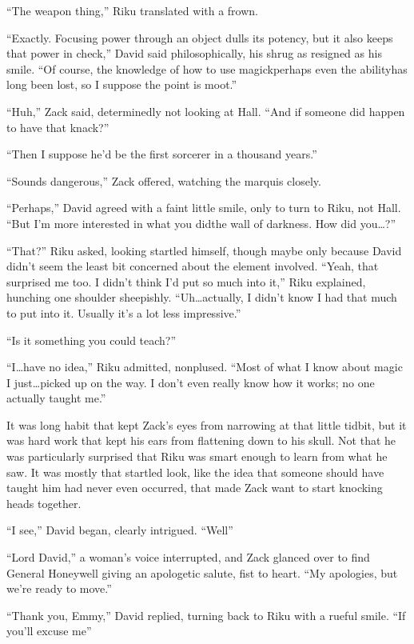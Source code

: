 ``The weapon thing,'' Riku translated with a frown.

``Exactly. Focusing power through an object dulls its potency, but it also keeps that power in check,'' David said philosophically, his shrug as resigned as his smile. ``Of course, the knowledge of how to use magick\textemdash perhaps even the ability\textemdash has long been lost, so I suppose the point is moot.''

``Huh,'' Zack said, determinedly not looking at Hall. ``And if someone did happen to have that knack?''

``Then I suppose he'd be the first sorcerer in a thousand years.''

``Sounds dangerous,'' Zack offered, watching the marquis closely.

``Perhaps,'' David agreed with a faint little smile, only to turn to Riku, not Hall. ``But I'm more interested in what you did\textemdash the wall of darkness. How did you\ldots ?''

``That?'' Riku asked, looking startled himself, though maybe only because David didn't seem the least bit concerned about the element involved. ``Yeah, that surprised me too. I didn't think I'd put so much into it,'' Riku explained, hunching one shoulder sheepishly. ``Uh\ldots actually, I didn't know I had that much to put into it. Usually it's a lot less impressive.''

``Is it something you could teach?''

``I\ldots have no idea,'' Riku admitted, nonplused. ``Most of what I know about magic I just\ldots picked up on the way. I don't even really know how it works; no one actually taught me.''

It was long habit that kept Zack's eyes from narrowing at that little tidbit, but it was hard work that kept his ears from flattening down to his skull. Not that he was particularly surprised that Riku was smart enough to learn from what he saw. It was mostly that startled look, like the idea that someone should have taught him had never even occurred, that made Zack want to start knocking heads together.

``I see,'' David began, clearly intrigued. ``Well\textemdash ''

``Lord David,'' a woman's voice interrupted, and Zack glanced over to find General Honeywell giving an apologetic salute, fist to heart. ``My apologies, but we're ready to move.''

``Thank you, Emmy,'' David replied, turning back to Riku with a rueful smile. ``If you'll excuse me\textemdash ''

